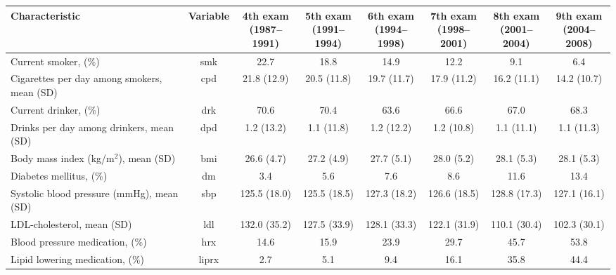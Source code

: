 
\begin{tabular}{lccccccc}
\toprule
Characteristic & Variable & \shortstack{4th exam \\ (1987–1991)} & \shortstack{5th exam \\ (1991–1994)} & \shortstack{6th exam \\ (1994–1998)} & \shortstack{7th exam \\ (1998–2001)} & \shortstack{8th exam \\ (2001–2004)} & \shortstack{9th exam \\ (2004–2008)}\\
\midrule
Current smoker, (\%) & smk & 22.7 & 18.8 & 14.9 & 12.2 & 9.1 & 6.4\\
Cigarettes per day among smokers, mean (SD) & cpd & 21.8 (12.9) & 20.5 (11.8) & 19.7 (11.7) & 17.9 (11.2) & 16.2 (11.1) & 14.2 (10.7)\\
Current drinker, (\%) & drk & 70.6 & 70.4 & 63.6 & 66.6 & 67.0 & 68.3\\
Drinks per day among drinkers, mean (SD) & dpd & 1.2 (13.2) & 1.1 (11.8) & 1.2 (12.2) & 1.2 (10.8) & 1.1 (11.1) & 1.1 (11.3)\\
Body mass index (kg/m$^2$), mean (SD) & bmi & 26.6 (4.7) & 27.2 (4.9) & 27.7 (5.1) & 28.0 (5.2) & 28.1 (5.3) & 28.1 (5.3)\\
Diabetes mellitus, (\%) & dm & 3.4 & 5.6 & 7.6 & 8.6 & 11.6 & 13.4\\
Systolic blood pressure (mmHg), mean (SD) & sbp & 125.5 (18.0) & 125.5 (18.5) & 127.3 (18.2) & 126.6 (18.5) & 128.8 (17.3) & 127.1 (16.1)\\
LDL-cholesterol, mean (SD) & ldl & 132.0 (35.2) & 127.5 (33.9) & 128.1 (33.3) & 122.1 (31.9) & 110.1 (30.4) & 102.3 (30.1)\\
Blood pressure medication, (\%) & hrx & 14.6 & 15.9 & 23.9 & 29.7 & 45.7 & 53.8\\
Lipid lowering medication, (\%) & liprx & 2.7 & 5.1 & 9.4 & 16.1 & 35.8 & 44.4\\
\bottomrule
\end{tabular}
